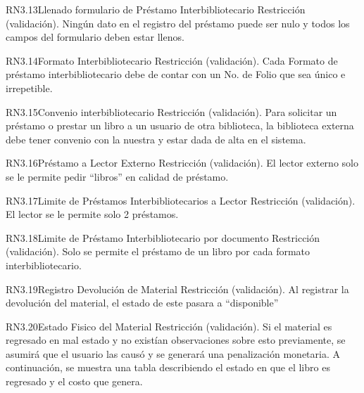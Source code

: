 \begin{BussinesRule}{RN3.13}{Llenado formulario de Préstamo Interbibliotecario} 
	\BRitem[Tipo:] Restricción (validación).
	\BRitem[Descripción:]Ningún dato en el registro del préstamo puede ser nulo y todos los campos del formulario deben estar llenos.
\end{BussinesRule}

\begin{BussinesRule}{RN3.14}{Formato Interbibliotecario} 
	\BRitem[Tipo:] Restricción (validación).
	\BRitem[Descripción:]Cada Formato de préstamo interbibliotecario debe de contar con un No. de Folio que sea único e irrepetible.
\end{BussinesRule}

\begin{BussinesRule}{RN3.15}{Convenio interbibliotecario} 
	\BRitem[Tipo:] Restricción (validación).
	\BRitem[Descripción:]Para solicitar un préstamo o prestar un libro a un usuario de otra biblioteca, la biblioteca externa debe tener convenio con la nuestra y estar dada de alta en el sistema. 
\end{BussinesRule}

\begin{BussinesRule}{RN3.16}{Préstamo a Lector Externo} 
	\BRitem[Tipo:] Restricción (validación).
	\BRitem[Descripción:]El lector externo solo se le permite pedir “libros” en calidad de préstamo.
\end{BussinesRule}

\begin{BussinesRule}{RN3.17}{Limite de Préstamos Interbibliotecarios a Lector } 
	\BRitem[Tipo:] Restricción (validación).
	\BRitem[Descripción:]El lector se le permite solo 2 préstamos.
\end{BussinesRule}

\begin{BussinesRule}{RN3.18}{Limite de Préstamo Interbibliotecario por documento} 
	\BRitem[Tipo:] Restricción (validación).
	\BRitem[Descripción:]Solo se permite el préstamo de un libro por cada formato interbibliotecario.
\end{BussinesRule}

\begin{BussinesRule}{RN3.19}{Registro Devolución de Material } 
	\BRitem[Tipo:] Restricción (validación).
	\BRitem[Descripción:]Al registrar la devolución del material, el estado de este pasara a “disponible”
\end{BussinesRule}

\begin{BussinesRule}{RN3.20}{Estado Fisico del Material} 
	\BRitem[Tipo:] Restricción (validación).
	\BRitem[Descripción:]Si el material es regresado en mal estado y no existían observaciones sobre esto previamente, se asumirá que el usuario las causó y se generará una penalización monetaria. A continuación, se muestra una tabla describiendo el estado en que el libro es regresado y el costo que genera.
\end{BussinesRule}

